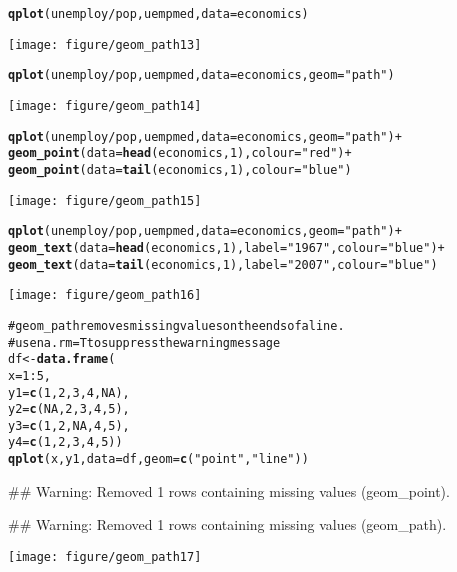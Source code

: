 \documentclass[a4paper,titlepage]{tufte-handout}\usepackage{graphicx, color}
\makeatletter
\def\maxwidth{ %
  \ifdim\Gin@nat@width>\linewidth
    \linewidth
  \else
    \Gin@nat@width
  \fi
}
\newcommand{\hlfunctioncall}[1]{\textcolor[rgb]{0.501960784313725,0,0.329411764705882}{\textbf{#1}}}%
\newcommand{\hlstring}[1]{\textcolor[rgb]{0.6,0.6,1}{#1}}%
\newcommand{\hlcomment}[1]{\textcolor[rgb]{0.180392156862745,0.6,0.341176470588235}{#1}}%
\newenvironment{kframe}{%
 \def\at@end@of@kframe{}%
 \ifinner\ifhmode%
  \def\at@end@of@kframe{\end{minipage}}%
  \begin{minipage}{\columnwidth}%
 \fi\fi%
 \def\FrameCommand##1{\hskip\@totalleftmargin \hskip-\fboxsep
 \colorbox{shadecolor}{##1}\hskip-\fboxsep
     \hskip-\linewidth \hskip-\@totalleftmargin \hskip\columnwidth}%
 \MakeFramed {\advance\hsize-\width
   \@totalleftmargin\z@ \linewidth\hsize
   \@setminipage}}%
 {\par\unskip\endMakeFramed%
 \at@end@of@kframe}
\newenvironment{knitrout}{}{} %
\makeatother
\begin{document}
\begin{knitrout}
\begin{kframe}
\begin{alltt}
\hlfunctioncall{qplot}(unemploy/pop, uempmed, data=economics)
\end{alltt}
\end{kframe}\texttt{[image: figure/geom\_path13]} \begin{kframe}\begin{alltt}
\hlfunctioncall{qplot}(unemploy/pop, uempmed, data=economics, geom=\hlstring{"path"})
\end{alltt}
\end{kframe}\texttt{[image: figure/geom\_path14]} \begin{kframe}\begin{alltt}
\hlfunctioncall{qplot}(unemploy/pop, uempmed, data=economics, geom=\hlstring{"path"}) +
  \hlfunctioncall{geom_point}(data=\hlfunctioncall{head}(economics, 1), colour=\hlstring{"red"}) +
  \hlfunctioncall{geom_point}(data=\hlfunctioncall{tail}(economics, 1), colour=\hlstring{"blue"})
\end{alltt}
\end{kframe}\texttt{[image: figure/geom\_path15]} \begin{kframe}\begin{alltt}
\hlfunctioncall{qplot}(unemploy/pop, uempmed, data=economics, geom=\hlstring{"path"}) +
  \hlfunctioncall{geom_text}(data=\hlfunctioncall{head}(economics, 1), label=\hlstring{"1967"}, colour=\hlstring{"blue"}) +
  \hlfunctioncall{geom_text}(data=\hlfunctioncall{tail}(economics, 1), label=\hlstring{"2007"}, colour=\hlstring{"blue"})
\end{alltt}
\end{kframe}\texttt{[image: figure/geom\_path16]} \begin{kframe}\begin{alltt}
\hlcomment{# geom_path removes missing values on the ends of a line.}
\hlcomment{# use na.rm = T to suppress the warning message}
df <- \hlfunctioncall{data.frame}(
  x = 1:5,
  y1 = \hlfunctioncall{c}(1, 2, 3, 4, NA),
  y2 = \hlfunctioncall{c}(NA, 2, 3, 4, 5),
  y3 = \hlfunctioncall{c}(1, 2, NA, 4, 5),
  y4 = \hlfunctioncall{c}(1, 2, 3, 4, 5))
\hlfunctioncall{qplot}(x, y1, data = df, geom = \hlfunctioncall{c}(\hlstring{"point"},\hlstring{"line"}))
\end{alltt}
\begin{flushleft}\ttfamily\noindent\textcolor{warningcolor}{\#\# Warning: Removed 1 rows containing missing values (geom\_point).}\end{flushleft}\begin{flushleft}\ttfamily\noindent\textcolor{warningcolor}{\#\# Warning: Removed 1 rows containing missing values (geom\_path).}\end{flushleft}\end{kframe}\texttt{[image: figure/geom\_path17]} \begin{kframe}\begin{alltt}

\end{alltt}
\end{kframe}
\end{knitrout}
\end{document}
